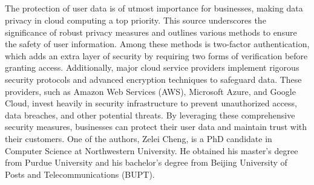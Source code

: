 \documentclass[12pt,letterpaper]{article}
\begin{document}
\subsection*{}
The protection of user data is of utmost importance for businesses, making data privacy in cloud computing a top priority. This source underscores the significance of robust privacy measures and outlines various methods to ensure the safety of user information. Among these methods is two-factor authentication, which adds an extra layer of security by requiring two forms of verification before granting access. Additionally, major cloud service providers implement rigorous security protocols and advanced encryption techniques to safeguard data. These providers, such as Amazon Web Services (AWS), Microsoft Azure, and Google Cloud, invest heavily in security infrastructure to prevent unauthorized access, data breaches, and other potential threats. By leveraging these comprehensive security measures, businesses can protect their user data and maintain trust with their customers.
One of the authors, Zelei Cheng, is a PhD candidate in Computer Science at Northwestern University. He obtained his master's degree from Purdue University and his bachelor's degree from Beijing University of Posts and Telecommunications (BUPT).





 
\end{document}
